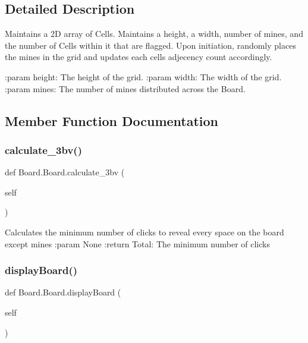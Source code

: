 \subsection{Detailed Description}
\begin{DoxyVerb}Maintains a 2D array of Cells. Maintains a height, a width, number of mines,
and the number of Cells within it that are flagged. Upon initiation,
randomly places the mines in the grid and updates each cells adjecency count
accordingly.

:param height: The height of the grid.
:param width: The width of the grid.
:param mines: The number of mines distributed across the Board.
\end{DoxyVerb}
 

\subsection{Member Function Documentation}
\mbox{\label{class_board_1_1_board_a9f3fd38d0abf01671f3d8bb0f3ceea5e}} 
\subsubsection{\texorpdfstring{calculate\+\_\+3bv()}{calculate\_3bv()}}
{\footnotesize\ttfamily def Board.\+Board.\+calculate\+\_\+3bv (\begin{DoxyParamCaption}\item[{}]{self }\end{DoxyParamCaption})}

\begin{DoxyVerb}Calculates the minimum number of clicks to reveal every space on the board except mines
:param None
:return Total: The minimum number of clicks
\end{DoxyVerb}
 \mbox{\label{class_board_1_1_board_af52ea18259bf8d2a122de08fcb0ea308}} 
\subsubsection{\texorpdfstring{display\+Board()}{displayBoard()}}
{\footnotesize\ttfamily def Board.\+Board.\+display\+Board (\begin{DoxyParamCaption}\item[{}]{self }\end{DoxyParamCaption})}

